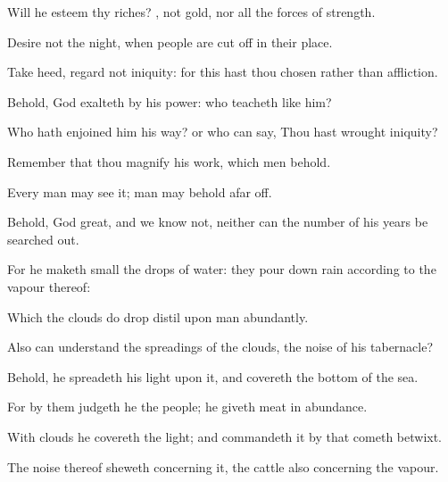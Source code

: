 {Will he
esteem thy
riches?
{}, not
gold, nor all the
forces of
strength.

Desire not the
night, when
people are cut
off in their place.

Take
heed,
regard not
iniquity: for this hast thou
chosen rather than
affliction.

Behold,
God
exalteth by his
power: who
teacheth like him?

Who hath
enjoined him his
way? or who can
say, Thou hast
wrought
iniquity?


\par }{\PP {}Remember that thou
magnify his
work, which
men
behold.

Every
man may
see it;
man may
behold
{} afar
off.

Behold,
God
{}
great, and we
know
{} not, neither can the
number of his
years be searched
out.

For he maketh
small the
drops of
water: they pour
down
rain according to the
vapour thereof:

Which the
clouds do
drop
{}
distil upon
man
abundantly.

Also can
{}
understand the
spreadings of the
clouds,
{} the
noise of his
tabernacle?

Behold, he
spreadeth his
light upon it, and
covereth the
bottom of the
sea.

For by them
judgeth he the
people; he
giveth
meat in
abundance.

With
clouds he
covereth the
light; and
commandeth it
{} by
{} that cometh
betwixt.

The
noise thereof
sheweth concerning it, the
cattle also concerning the
vapour.




\par }
